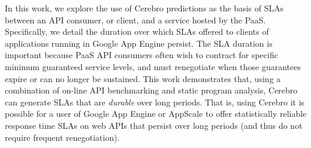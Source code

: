 In this work, we
explore the use of Cerebro predictions as the basis of SLAs between an API
consumer, or client,
and a service hosted by the PaaS.  Specifically, we detail the duration
over which SLAs offered to clients of applications running in Google App
Engine persist. The SLA duration is important because PaaS API consumers
often
wish to contract for specific minimum guaranteed service levels, and must
renegotiate when those guarantees expire or can no longer be sustained.  
This work demonstrates that, using a combination of on-line API benchmarking
and static program analysis, Cerebro can generate SLAs that are
\textit{durable} over long periods.  That is, using Cerebro it is possible for
a user of Google App Engine or AppScale to offer statistically
reliable response time SLAs on web APIs
that persist over long periods (and thus do not require frequent
renegotiation).


